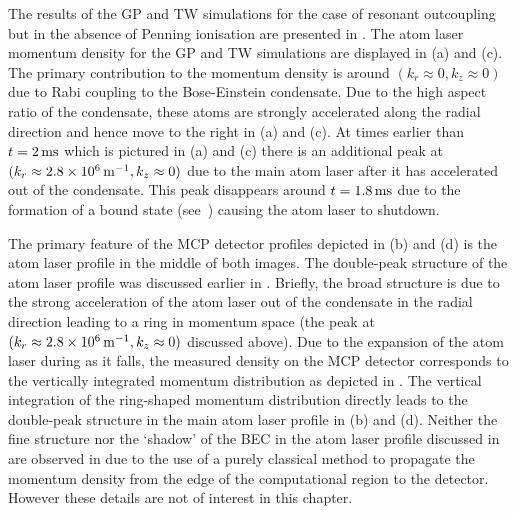 The results of the GP and TW simulations for the case of resonant outcoupling but in the absence of Penning ionisation are presented in . The atom laser momentum density for the GP and TW simulations are displayed in (a) and (c). The primary contribution to the momentum density is around $(k_r \approx 0, k_z \approx 0)$ due to Rabi coupling to the Bose-Einstein condensate. Due to the high aspect ratio of the condensate, these atoms are strongly accelerated along the radial direction and hence move to the right in (a) and (c). At times earlier than $t=\unit[2]{ms}$ which is pictured in (a) and (c) there is an additional peak at $(k_r \approx \unit[2.8 \times 10^6]{m}^{-1}, k_z \approx 0)$ due to the main atom laser after it has accelerated out of the condensate. This peak disappears around $t=\unit[1.8]{ms}$ due to the formation of a bound state (see~\citep{Robins:2005uq}) causing the atom laser to shutdown.

The primary feature of the MCP detector profiles depicted in (b) and (d) is the atom laser profile in the middle of both images. The double-peak structure of the atom laser profile was discussed earlier in . Briefly, the broad structure is due to the strong acceleration of the atom laser out of the condensate in the radial direction leading to a ring in momentum space (the peak at $(k_r \approx \unit[2.8 \times10^6]{m}^{-1}, k_z \approx 0)$ discussed above). Due to the expansion of the atom laser during as it falls, the measured density on the MCP detector corresponds to the vertically integrated momentum distribution as depicted in . The vertical integration of the ring-shaped momentum distribution directly leads to the double-peak structure in the main atom laser profile in (b) and (d). Neither the fine structure nor the `shadow' of the BEC in the atom laser profile discussed in  are observed in  due to the use of a purely classical method to propagate the momentum density from the edge of the computational region to the detector. However these details are not of interest in this chapter.

